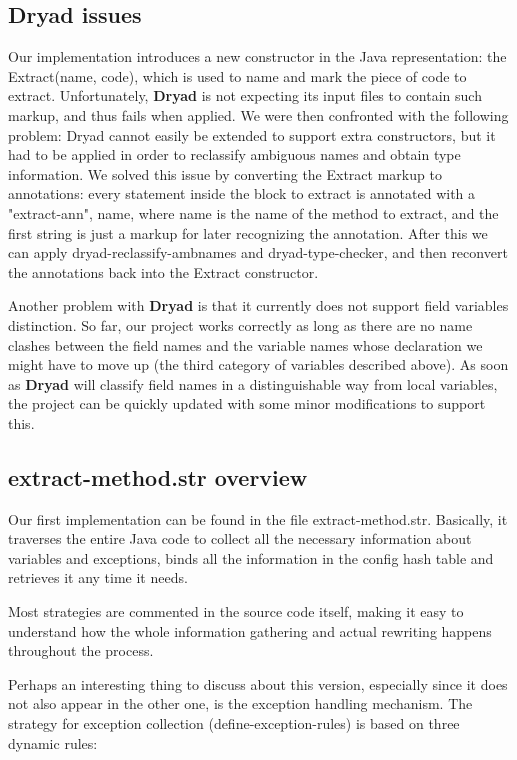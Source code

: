 \documentclass[a4paper,10pt]{article}
\begin{document}
\subsection{\textbf{Dryad} issues}
Our implementation introduces a new constructor in the Java
representation: the \textsf{Extract(name, code)}, which is used to
name and mark the piece of code to extract. Unfortunately,
\textbf{Dryad} is not expecting its input files to contain such
markup, and thus fails when applied. We were then confronted with
the following problem: Dryad cannot easily be extended to support
extra constructors, but it had to be applied in order to reclassify
ambiguous names and obtain type information. We solved this issue by
converting the \textsf{Extract} markup to annotations: every
statement inside the block to extract is annotated with a
\textsf{{"extract-ann", name}}, where \textsf{name} is the name of
the method to extract, and the first string is just a markup for
later recognizing the annotation. After this we can apply
\textsf{dryad-reclassify-ambnames} and \textsf{dryad-type-checker},
and then reconvert the annotations back into the \textsf{Extract}
constructor.

Another problem with \textbf{Dryad} is that it currently does not
support field variables distinction. So far, our project works correctly
as long as there are no name clashes between the field names and
the variable names whose declaration we might have to move up
(the third category of variables described above). As soon as \textbf{Dryad}
will classify field names in a distinguishable way from local variables,
the project can be quickly updated with some minor modifications
to support this.

\subsection{\textsf{extract-method.str} overview}

Our first implementation can be found in the file
\textsf{extract-method.str}. Basically, it traverses the entire Java
code to collect all the necessary information about variables and
exceptions, binds all the information in the \textsf{config} hash
table and retrieves it any time it needs.

Most strategies are commented in the source code itself, making it
easy to understand how the whole information gathering and actual
rewriting happens throughout the process.

Perhaps an interesting thing to discuss about this version, especially
since it does not also appear in the other one, is the exception handling
mechanism. The strategy for exception collection (\textsf{define-exception-rules})
is based on three dynamic rules:
\end{document}

